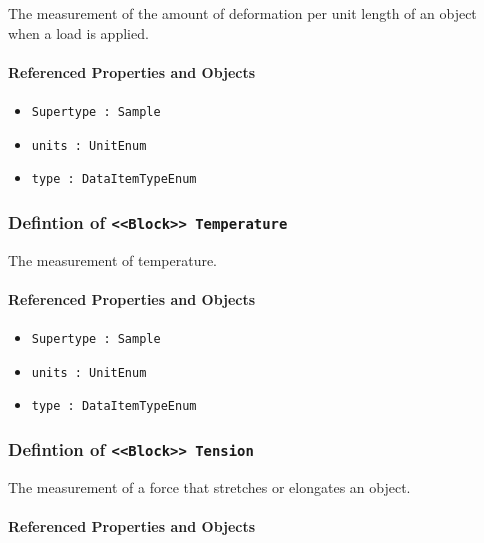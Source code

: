 \FloatBarrier

The measurement of the amount of deformation per unit length of an object when a load is applied.

\FloatBarrier
\paragraph{Referenced Properties and Objects}

\begin{itemize}
\item \texttt{Supertype : Sample}

\item \texttt{units : UnitEnum}

\item \texttt{type : DataItemTypeEnum}

\end{itemize}
\FloatBarrier
\subsubsection{Defintion of \texttt{<<Block>> Temperature}}
  \label{type:Temperature}

\FloatBarrier

The measurement of temperature.

\FloatBarrier
\paragraph{Referenced Properties and Objects}

\begin{itemize}
\item \texttt{Supertype : Sample}

\item \texttt{units : UnitEnum}

\item \texttt{type : DataItemTypeEnum}

\end{itemize}
\FloatBarrier
\subsubsection{Defintion of \texttt{<<Block>> Tension}}
  \label{type:Tension}

\FloatBarrier

The measurement of a force that stretches or elongates an object.

\FloatBarrier
\paragraph{Referenced Properties and Objects}

